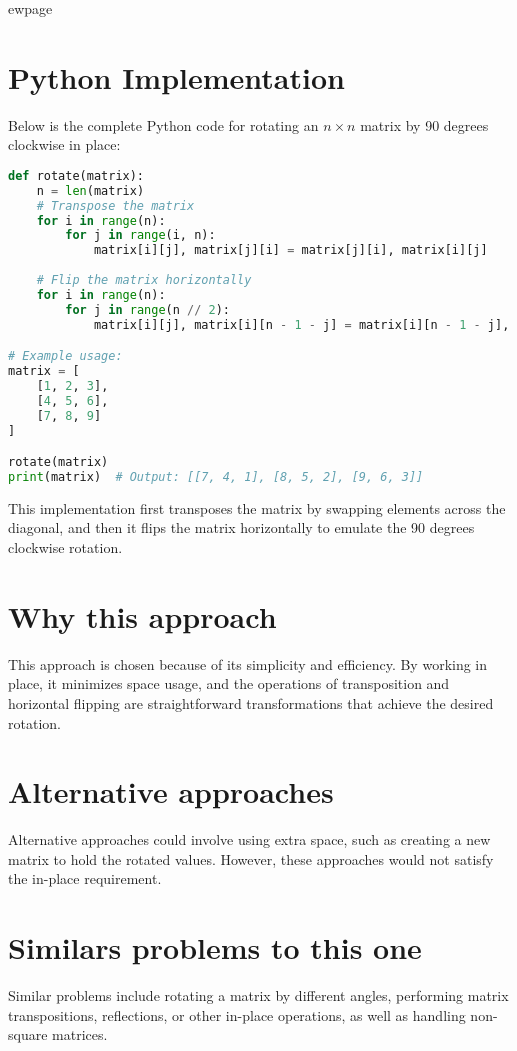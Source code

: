 ewpage %
\section*{Python Implementation}
Below is the complete Python code for rotating an \( n \times n \) matrix by 90 degrees clockwise in place:

\begin{fullwidth}
\begin{lstlisting}[language=Python]
def rotate(matrix):
    n = len(matrix)
    # Transpose the matrix
    for i in range(n):
        for j in range(i, n):
            matrix[i][j], matrix[j][i] = matrix[j][i], matrix[i][j]
    
    # Flip the matrix horizontally
    for i in range(n):
        for j in range(n // 2):
            matrix[i][j], matrix[i][n - 1 - j] = matrix[i][n - 1 - j], matrix[i][j]

# Example usage:
matrix = [
    [1, 2, 3],
    [4, 5, 6],
    [7, 8, 9]
]

rotate(matrix)
print(matrix)  # Output: [[7, 4, 1], [8, 5, 2], [9, 6, 3]]
\end{lstlisting}

\end{fullwidth}

This implementation first transposes the matrix by swapping elements across the diagonal, and then it flips the matrix horizontally to emulate the 90 degrees clockwise rotation.

\section*{Why this approach}
This approach is chosen because of its simplicity and efficiency. By working in place, it minimizes space usage, and the operations of transposition and horizontal flipping are straightforward transformations that achieve the desired rotation.

\section*{Alternative approaches}
Alternative approaches could involve using extra space, such as creating a new matrix to hold the rotated values. However, these approaches would not satisfy the in-place requirement.

\section*{Similars problems to this one}
Similar problems include rotating a matrix by different angles, performing matrix transpositions, reflections, or other in-place operations, as well as handling non-square matrices.

